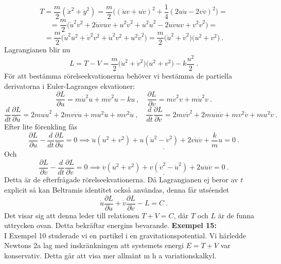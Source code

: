 \documentclass{article}
\begin{document}
$$
T=\frac{m}{2}(\dot{x}^2+\dot{y}^2)=\frac{m}{2}\Big((\dot{u}v+u\dot{v})^2+\frac{1}{4}(2u\dot{u}-2v\dot{v})^2\Big)=
$$
$$
=\frac{m}{2}\Big(\dot{u}^2v^2+2\dot{u}\dot{v}uv+u^2\dot{v}^2+u^2\dot{u}^2-2\dot{u}\dot{v}uv+v^2\dot{v}^2\Big)=
$$
$$
=\frac{m}{2}\Big(\dot{u}^2u^2+\dot{v}^2v^2+\dot{u}^2v^2+u^2\dot{v}^2\Big)=\frac{m}{2}\big(\dot{u}^2+\dot{v}^2\big)\big(u^2+v^2\big) \ .
$$
Lagrangianen blir nu
$$
L=T-V=\frac{m}{2}\big(\dot{u}^2+\dot{v}^2\big)\big(u^2+v^2\big)-k\frac{u^2}{2} \ .
$$
För att bestämma rörelseekvationerna behöver vi bestämma de partiella derivatorna i Euler-Lagranges ekvationer:
$$
\frac{\partial L}{\partial u}=m\dot{u}^2u+m\dot{v}^2u-ku \ , \quad \frac{\partial L}{\partial v}=m\dot{v}^2v+m\dot{u}^2v \ .
$$
$$
\frac{d}{dt}\frac{\partial L}{\partial \dot{u}}=2mu\dot{u}^2+2mv\dot{v}\dot{u}+mu^2\ddot{u}+mv^2\ddot{u} \ , \quad \frac{d}{dt}\frac{\partial L}{\partial \dot{v}}=2mv\dot{v}^2+2mu\dot{u}\dot{v}+mv^2\ddot{v}+mu^2\ddot{v} \ .
$$
Efter lite förenkling fås
$$
\frac{\partial L}{\partial u}-\frac{d}{dt}\frac{\partial L}{\partial \dot{u}}=0 \implies \underline{\ddot{u}(u^2+v^2)+u(\dot{u}^2-\dot{v}^2)+2v\dot{u}\dot{v}+\frac{k}{m}u=0} \ .
$$
Och
$$
\frac{\partial L}{\partial v}-\frac{d}{dt}\frac{\partial L}{\partial \dot{v}}=0 \implies \underline{\ddot{v}(u^2+v^2)+v(\dot{v}^2-\dot{u}^2)+2u\dot{u}\dot{v}=0} \ .
$$
Detta är de efterfrågade rörelseekvationerna. Då Lagrangianen ej beror av $t$ explicit så kan Beltramis identitet också användas, denna får utséendet
$$
\dot{u}\frac{\partial L}{\partial \dot{u}}+\dot{v}\frac{\partial L}{\partial \dot{v}}-L=C \ .
$$
Det visar sig att denna leder till relationen $T+V=C$, där $T$ och $L$ är de funna uttrycken ovan. Detta bekräftar energins bevarande.
\newpage
\noindent
\textbf{Exempel 15:}\\
I Exempel 10 studerade vi en partikel i en gravitationspotential. Vi härledde Newtons 2a lag med inskränkningen att systemets energi $E=T+V$ var konservativ. Detta går att visa mer allmänt m h a variationskalkyl.\\
\end{document}
